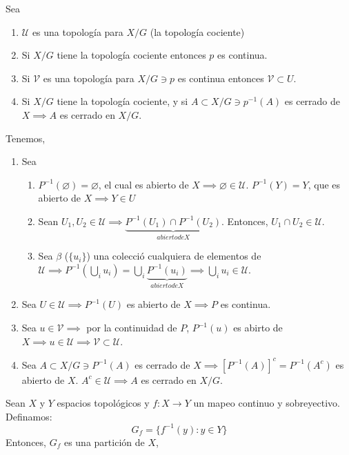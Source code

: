 \begin{teorema}
    Sea
    \begin{enumerate}
        \item $\mathcal{U}$ es una topología para $X/G$ (la topología cociente)
        \item Si $X/G$ tiene la topología cociente entonces $p$ es continua. 
        \item Si $\mathcal{V}$ es una topología para $X/G\ni p$ es continua entonces $\mathcal{V}\subset U$. 
        \item Si $X/G$ tiene la topología cociente, y si $A\subset X/G\ni p^{-1}(A)$ es cerrado de $X\implies A$ es cerrado en $X/G$.
    \end{enumerate}
    \begin{dem}
        Tenemos,
        \begin{enumerate}
            \item Sea \begin{enumerate}
                \item $P^{-1}(\varnothing)=\varnothing$, el cual es abierto de $X\implies \varnothing\in\mathcal{U}$. $P^{-1}(Y)=Y$, que es abierto de $X\implies Y\in U$
                \item Sean $U_1,U_2\in \mathcal{U}\implies \underbrace{P^{-1}(U_1)\cap P^{-1}(U_2)}_{abierto de X}$. Entonces, $U_1\cap U_2\in \mathcal{U}$.
                \item Sea $\beta$ ($\{u_i\}$) una colecció cualquiera de elementos de $\mathcal{U}\implies P^{-1}(\bigcup_i u_i)=\bigcup_i \underbrace{P^{-1}(u_i)}_{abierto de X}\implies \bigcup_i u_i\in \mathcal{U}$. 
            \end{enumerate}
            \item Sea $U\in \mathcal{U}\implies P^{-1}(U)$ es abierto de $X\implies P $ es continua. 
            \item Sea $u\in \mathcal{V}\implies$ por la continuidad de $P$, $P^{-1}(u)$ es abirto de $X\implies u\in \mathcal{U}\implies \mathcal{V}\subset \mathcal{U}$.
            \item Sea $A\subset X/G\ni P^{-1}(A)$ es cerrado de $X\implies [P^{-1}(A)]^c=P^{-1}(A^c)$ es abierto de $X$. $A^c\in \mathcal{U}\implies A$ es cerrado en $X/G$.  
        \end{enumerate}
    \end{dem}
\end{teorema}

\begin{nota}
    Sean $X$ y $Y$ espacios topológicos y $f: X\to Y$ un mapeo continuo y sobreyectivo. Definamos: 
    $$G_f=\{f^{-1}(y): y\in Y \}$$
    Entonces, $G_f$ es una partición de $X$, 
\end{nota}
